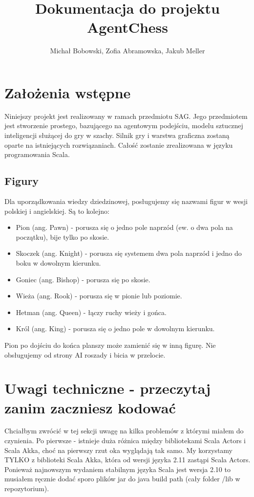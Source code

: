 \documentclass[a4paper,12pt,oneside,notitlepage,onecolumn]{article}
\author{Michał Bobowski, Zofia Abramowska, Jakub Meller}
\title{Dokumentacja do projektu AgentChess}
\begin{document}
  \maketitle
\section{Założenia wstępne}
Niniejszy projekt jest realizowany w ramach przedmiotu SAG.
Jego przedmiotem jest stworzenie prostego, bazującego na agentowym podejściu, modelu sztucznej inteligencji służącej do gry w szachy.
Silnik gry i warstwa graficzna zostaną oparte na istniejących rozwiązaniach.
Całość zostanie zrealizowana w języku programowania Scala.

\subsection{Figury}
Dla uporządkowania wiedzy dziedzinowej, posługujemy się nazwami figur w wesji polskiej i angielskiej.
Są to kolejno:
\begin{itemize}
 \item Pion (ang. Pawn) - porusza się o jedno pole naprzód (ew. o dwa pola na początku), bije tylko po skosie.
 \item Skoczek (ang. Knight) - porusza się systemem dwa pola naprzód i jedno do boku w dowolnym kierunku.
 \item Goniec (ang. Bishop) - porusza się po skosie.
 \item Wieża (ang. Rook) - porusza się w pionie lub poziomie.
 \item Hetman (ang. Queen) - łączy ruchy wieży i gońca.
 \item Król (ang. King) - porusza się o jedno pole w dowolnym kierunku.
\end{itemize}

Pion po dojściu do końca planszy może zamienić się w inną figurę.
Nie obsługujemy od strony AI roszady i bicia w przelocie.

\section{Uwagi techniczne - przeczytaj zanim zaczniesz kodować}
Chciałbym zwrócić w tej sekcji uwagę na kilka problemów z którymi miałem do czynienia.
Po pierwsze - istnieje duża różnica między bibliotekami Scala Actors i Scala Akka, choć na pierwszy rzut oka wyglądają tak samo.
My korzystamy TYLKO z biblioteki Scala Akka, która od wersji języka 2.11 zastąpi Scala Actors.
Ponieważ najnowszym wydaniem stabilnym języka Scala jest wersja 2.10 to musiałem ręcznie dodać sporo plików jar do java build path (cały folder /lib w repozytorium).
\end{document}
